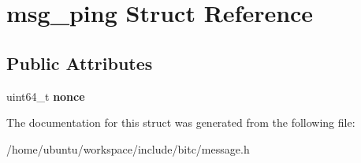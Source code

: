 \hypertarget{structmsg__ping}{\section{msg\-\_\-ping Struct Reference}
\label{structmsg__ping}
}
\subsection*{Public Attributes}
\begin{DoxyCompactItemize}
\item 
\hypertarget{structmsg__ping_a5dc8007537501e721ea12eb8b3df0428}{uint64\-\_\-t {\bfseries nonce}}\label{structmsg__ping_a5dc8007537501e721ea12eb8b3df0428}

\end{DoxyCompactItemize}


The documentation for this struct was generated from the following file\-:\begin{DoxyCompactItemize}
\item 
/home/ubuntu/workspace/include/bitc/message.\-h\end{DoxyCompactItemize}
